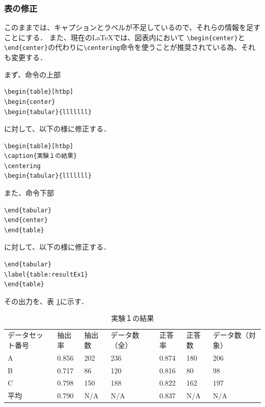 \subsubsection{表の修正}
このままでは、キャプションとラベルが不足しているので、それらの情報を足すことにする．
また、現在の\LaTeX では、図表内において \verb+\begin{center}+と\verb+\end{center}+の代わりに\verb+\centering+命令を使うことが推奨されている為、それも変更する．

まず、命令の上部
\begin{breakbox}
{\small
\begin{verbatim}
\begin{table}[htbp]
\begin{center}
\begin{tabular}{lllllll}
\end{verbatim}
}
\end{breakbox}
に対して、以下の様に修正する．
\begin{breakbox}
{\small
\begin{verbatim}
\begin{table}[htbp]
\caption{実験１の結果}
\centering
\begin{tabular}{lllllll}
\end{verbatim}
}
\end{breakbox}

また、命令下部
\begin{breakbox}
{\small
\begin{verbatim}
\end{tabular}
\end{center}
\end{table}
\end{verbatim}
}
\end{breakbox}
に対して、以下の様に修正する．
\begin{breakbox}
{\small
\begin{verbatim}
\end{tabular}
\label{table:resultEx1}
\end{table}
\end{verbatim}
}
\end{breakbox}


その出力を、表 \ref{table:resultEx1a}に示す．
\begin{table}[H]
\caption{実験１の結果}
\centering
\begin{tabular}{lllllll}
データセット番号 & 抽出率 & 抽出数 & データ数（全） & 正答率 & 正答数 & データ数（対象）\\
A & 0.856 & 202 & 236 & 0.874 & 180 & 206\\
B & 0.717 & 86 & 120 & 0.816 & 80 & 98\\
C & 0.798 & 150 & 188 & 0.822 & 162 & 197\\
平均 & 0.790 & N/A & N/A & 0.837 & N/A & N/A\\
\end{tabular}
\label{table:resultEx1a}
\end{table}


